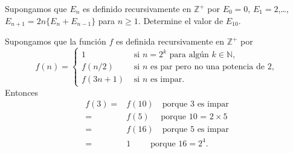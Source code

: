 %
%
%
%
%
%
%
%
%

\begin{prob}
\label{1}
Supongamos que $E_n$ es definido recursivamente en $\mathds{Z}^+$ por $E_0=0$, $E_1=2$,\ldots, $E_{n+1}=2n\{E_n+E_{n-1}\}$ para $n\geq1$. Determine el valor de $E_{10}$.
\end{prob}
\begin{prob}
Supongamos que la función $f$ es definida recursivamente en $\mathds{Z}^+$ por
\[
	f(n)=\begin{cases} 
	1 & \text{ si }n=2^k\text{ para algún }k\in\mathds{N},\\
	f(n/2) & \text{ si }n\text{ es par pero no una potencia de }2,
	\\ f(3n+1) & \text{ si }n\text{ es impar}.
	\end{cases}
\]
Entonces 
\begin{align*}
	f(3)=
	&f(10)\quad \text{porque 3 es impar} \\
	=&f(5)\quad \text{  porque 10 = 2} \times 5\\
	=&f(16)\quad \text{porque 5 es impar}\\
	=&1\quad\quad\text{ porque 16} = 2^4.
\end{align*}
\end{prob}

